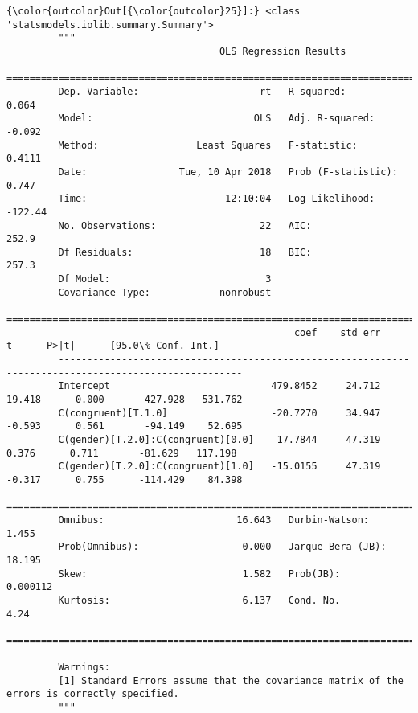 \documentclass[11pt]{article}
\begin{document}
\begin{Verbatim}[commandchars=\\\{\}]
{\color{outcolor}Out[{\color{outcolor}25}]:} <class 'statsmodels.iolib.summary.Summary'>
         """
                                     OLS Regression Results                            
         ==============================================================================
         Dep. Variable:                     rt   R-squared:                       0.064
         Model:                            OLS   Adj. R-squared:                 -0.092
         Method:                 Least Squares   F-statistic:                    0.4111
         Date:                Tue, 10 Apr 2018   Prob (F-statistic):              0.747
         Time:                        12:10:04   Log-Likelihood:                -122.44
         No. Observations:                  22   AIC:                             252.9
         Df Residuals:                      18   BIC:                             257.3
         Df Model:                           3                                         
         Covariance Type:            nonrobust                                         
         ======================================================================================================
                                                  coef    std err          t      P>|t|      [95.0\% Conf. Int.]
         ------------------------------------------------------------------------------------------------------
         Intercept                            479.8452     24.712     19.418      0.000       427.928   531.762
         C(congruent)[T.1.0]                  -20.7270     34.947     -0.593      0.561       -94.149    52.695
         C(gender)[T.2.0]:C(congruent)[0.0]    17.7844     47.319      0.376      0.711       -81.629   117.198
         C(gender)[T.2.0]:C(congruent)[1.0]   -15.0155     47.319     -0.317      0.755      -114.429    84.398
         ==============================================================================
         Omnibus:                       16.643   Durbin-Watson:                   1.455
         Prob(Omnibus):                  0.000   Jarque-Bera (JB):               18.195
         Skew:                           1.582   Prob(JB):                     0.000112
         Kurtosis:                       6.137   Cond. No.                         4.24
         ==============================================================================
         
         Warnings:
         [1] Standard Errors assume that the covariance matrix of the errors is correctly specified.
         """
\end{Verbatim}
            
\end{document}
